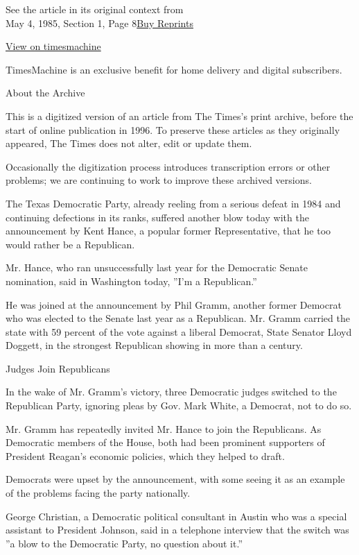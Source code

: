 See the article in its original context from\\
May 4, 1985, Section 1, Page
8\href{https://store.nytimes.com/collections/new-york-times-page-reprints?utm_source=nytimes\&utm_medium=article-page\&utm_campaign=reprints}{Buy
Reprints}

\href{http://timesmachine.nytimes.com/timesmachine/1985/05/04/215636.html}{View
on timesmachine}

TimesMachine is an exclusive benefit for home delivery and digital
subscribers.

About the Archive

This is a digitized version of an article from The Times's print
archive, before the start of online publication in 1996. To preserve
these articles as they originally appeared, The Times does not alter,
edit or update them.

Occasionally the digitization process introduces transcription errors or
other problems; we are continuing to work to improve these archived
versions.

The Texas Democratic Party, already reeling from a serious defeat in
1984 and continuing defections in its ranks, suffered another blow today
with the announcement by Kent Hance, a popular former Representative,
that he too would rather be a Republican.

Mr. Hance, who ran unsuccessfully last year for the Democratic Senate
nomination, said in Washington today, ''I'm a Republican.''

He was joined at the announcement by Phil Gramm, another former Democrat
who was elected to the Senate last year as a Republican. Mr. Gramm
carried the state with 59 percent of the vote against a liberal
Democrat, State Senator Lloyd Doggett, in the strongest Republican
showing in more than a century.

Judges Join Republicans

In the wake of Mr. Gramm's victory, three Democratic judges switched to
the Republican Party, ignoring pleas by Gov. Mark White, a Democrat, not
to do so.

Mr. Gramm has repeatedly invited Mr. Hance to join the Republicans. As
Democratic members of the House, both had been prominent supporters of
President Reagan's economic policies, which they helped to draft.

Democrats were upset by the announcement, with some seeing it as an
example of the problems facing the party nationally.

George Christian, a Democratic political consultant in Austin who was a
special assistant to President Johnson, said in a telephone interview
that the switch was ''a blow to the Democratic Party, no question about
it.''

